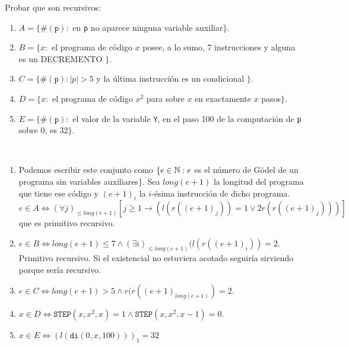 \documentclass[twoside]{article}
\begin{document}
\newpage
\begin{ejercicio}{6}
Probar que son recursivos:
\begin{enumerate}
\item $A = \{\#(\texttt{p}) :$ en \texttt{p} no aparece ninguna variable auxiliar$\}$.
\item $B = \{x :$ el programa de código $x$ posee, a lo sumo, 7 instrucciones y alguna es un DECREMENTO $\}$.
\item $C = \{\#(\texttt{p}) : |p| > 5$ y la última instrucción es un condicional $\}$.
\item $D = \{x :$ el programa de código $x^2$ para sobre $x$ en exactamente $x$ pasos$\}$.
\item $E = \{\#(\texttt{p}) :$ el valor de la variable \texttt{Y}, en el paso 100 de la computación de \texttt{p} sobre 0, es 32$\}$.
\end{enumerate}
\end{ejercicio}
\begin{solucion}\
\begin{enumerate}
\item Podemos escribir este conjunto como $\{e\in\mathbb{N}: e$ es el número de Gödel de un programa sin variables auxiliares$\}$. Sea $long(e+1)$ la longitud del programa que tiene ese código y $(e+1)_i$ la $i$-ésima instrucción de dicho programa. $e\in A\Leftrightarrow(\forall j)_{\leq long(e+1)}[j\geq 1\rightarrow (l(r((e+1)_j))=1\lor 2r(r((e+1)_j)))]$ que es primitivo recursivo.
\item $e\in B\Leftrightarrow long(e+1)\leq 7 \land (\exists i)_{\leq long(e+1)}(l(r((e+1)_i))=2$. Primitivo recursivo. Si el existencial no estuviera acotado seguiría sirviendo porque sería recursivo.
\item $e\in C\Leftrightarrow long(e+1)>5\land r(r((e+1)_{long(e+1)})=2$.
\item $x\in D\Leftrightarrow \texttt{STEP}(x,x^2,x)=1\land \texttt{STEP}(x,x^2,x-1)=0$. 
\item $x\in E\Leftrightarrow (l(\texttt{di}(0,x,100)))_1=32$
\end{enumerate}
\end{solucion}
\newpage
\end{document}
